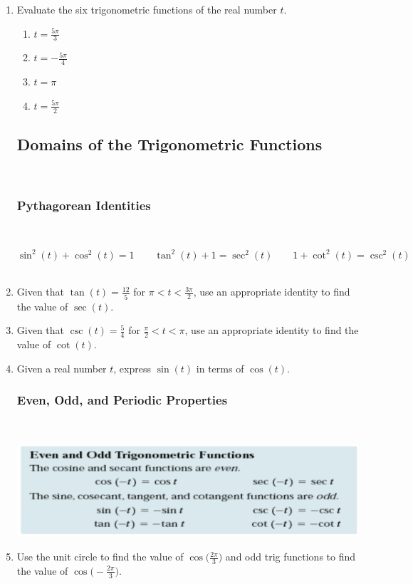\begin{enumerate}
\item Evaluate the six trigonometric functions of the real number $t$.
\begin{enumerate}
\item $\displaystyle t=\frac{5\pi}{3}$
\newpage
\item $\displaystyle t=-\frac{5\pi}{4}$\vfill
\item $\displaystyle t=\pi$\vfill
\item $\displaystyle t=\frac{5\pi}{2}$\vfill
\end{enumerate}


\newpage

\subsection{Domains of the Trigonometric Functions} ~


\subsubsection{Pythagorean Identities} ~

$$\sin^2(t)+\cos^2(t)=1 \quad \quad \tan^2(t)+1=\sec^2(t) \quad \quad 1+\cot^2(t)=\csc^2(t)$$
\\

\item Given that $\tan(t)=\frac{12}{5}$ for $\pi < t < \frac{3\pi}{2}$, use an appropriate identity to find the value of $\sec(t)$.\\[2in]

\item Given that $\csc(t)=\frac{5}{4}$ for $\frac{\pi}{2} < t < \pi$, use an appropriate identity to find the value of $\cot(t)$.\\[2in]

\item Given a real number $t$, express $\sin(t)$ in terms of $\cos(t)$.\\[1.5in]

\newpage

\subsubsection{Even, Odd, and Periodic Properties} ~

\includegraphics[scale=.6]{evenodd}\\
\item Use the unit circle to find the value of $\displaystyle \cos \Bigg(\frac{2\pi}{3}\Bigg)$ and odd trig functions to find the value of $\displaystyle \cos \Bigg(-\frac{2\pi}{3}\Bigg)$.


\end{enumerate}
